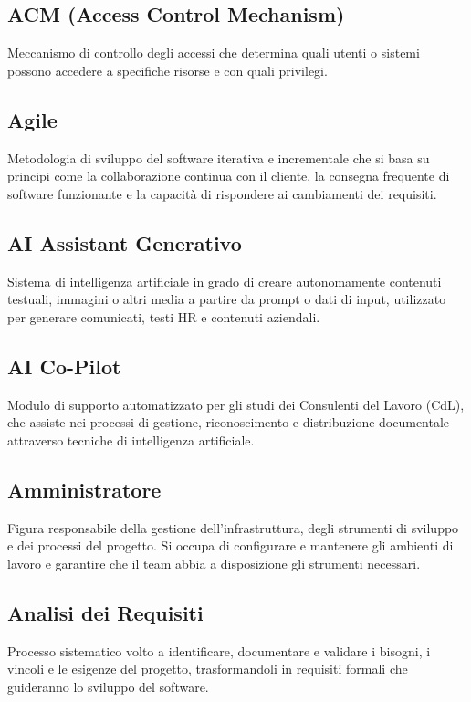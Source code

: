 \documentclass[a4paper,11pt]{article}
\begin{document}
\subsection{ACM (Access Control Mechanism)}
Meccanismo di controllo degli accessi che determina quali utenti o sistemi possono accedere a specifiche risorse e con quali privilegi.

\subsection{Agile}
Metodologia di sviluppo del software iterativa e incrementale che si basa su principi come la collaborazione continua con il cliente, la consegna frequente di software funzionante e la capacità di rispondere ai cambiamenti dei requisiti.

\subsection{AI Assistant Generativo}
Sistema di intelligenza artificiale in grado di creare autonomamente contenuti testuali, immagini o altri media a partire da prompt o dati di input, utilizzato per generare comunicati, testi HR e contenuti aziendali.

\subsection{AI Co-Pilot}
Modulo di supporto automatizzato per gli studi dei Consulenti del Lavoro (CdL), che assiste nei processi di gestione, riconoscimento e distribuzione documentale attraverso tecniche di intelligenza artificiale.

\subsection{Amministratore}
Figura responsabile della gestione dell'infrastruttura, degli strumenti di sviluppo e dei processi del progetto. Si occupa di configurare e mantenere gli ambienti di lavoro e garantire che il team abbia a disposizione gli strumenti necessari.

\subsection{Analisi dei Requisiti}
Processo sistematico volto a identificare, documentare e validare i bisogni, i vincoli e le esigenze del progetto, trasformandoli in requisiti formali che guideranno lo sviluppo del software.
\end{document}
